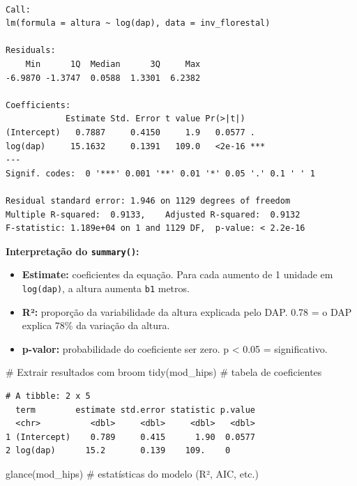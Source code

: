 \documentclass[
  letterpaper,
]{scrbook}
\newenvironment{Shaded}{\begin{snugshade}}{\end{snugshade}}
\newcommand{\CommentTok}[1]{\textcolor[rgb]{0.37,0.37,0.37}{#1}}
\newcommand{\FunctionTok}[1]{\textcolor[rgb]{0.28,0.35,0.67}{#1}}
\newcommand{\NormalTok}[1]{\textcolor[rgb]{0.00,0.23,0.31}{#1}}
\providecommand{\tightlist}{%
  \setlength{\itemsep}{0pt}\setlength{\parskip}{0pt}}
\begin{document}
\begin{verbatim}

Call:
lm(formula = altura ~ log(dap), data = inv_florestal)

Residuals:
    Min      1Q  Median      3Q     Max 
-6.9870 -1.3747  0.0588  1.3301  6.2382 

Coefficients:
            Estimate Std. Error t value Pr(>|t|)    
(Intercept)   0.7887     0.4150     1.9   0.0577 .  
log(dap)     15.1632     0.1391   109.0   <2e-16 ***
---
Signif. codes:  0 '***' 0.001 '**' 0.01 '*' 0.05 '.' 0.1 ' ' 1

Residual standard error: 1.946 on 1129 degrees of freedom
Multiple R-squared:  0.9133,    Adjusted R-squared:  0.9132 
F-statistic: 1.189e+04 on 1 and 1129 DF,  p-value: < 2.2e-16
\end{verbatim}

\textbf{Interpretação do \texttt{summary()}:}

\begin{itemize}
\tightlist
\item
  \textbf{Estimate:} coeficientes da equação. Para cada aumento de 1
  unidade em \texttt{log(dap)}, a altura aumenta \texttt{b1} metros.
\item
  \textbf{R²:} proporção da variabilidade da altura explicada pelo DAP.
  0.78 = o DAP explica 78\% da variação da altura.
\item
  \textbf{p-valor:} probabilidade do coeficiente ser zero. p \textless{}
  0.05 = significativo.
\end{itemize}

\begin{Shaded}
\begin{Highlighting}[]
\CommentTok{\# Extrair resultados com broom}
\FunctionTok{tidy}\NormalTok{(mod\_hips)     }\CommentTok{\# tabela de coeficientes}
\end{Highlighting}
\end{Shaded}

\begin{verbatim}
# A tibble: 2 x 5
  term        estimate std.error statistic p.value
  <chr>          <dbl>     <dbl>     <dbl>   <dbl>
1 (Intercept)    0.789     0.415      1.90  0.0577
2 log(dap)      15.2       0.139    109.    0     
\end{verbatim}

\begin{Shaded}
\begin{Highlighting}[]
\FunctionTok{glance}\NormalTok{(mod\_hips)   }\CommentTok{\# estatísticas do modelo (R², AIC, etc.)}
\end{Highlighting}
\end{Shaded}
\end{document}
